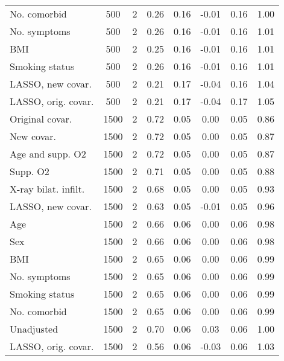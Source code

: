 \documentclass{article}
\begin{document}
\begin{table}[htbp]
{\begin{tabular}{lccccccc}
No. comorbid & 500 & 2 & 0.26 & 0.16 & -0.01 & 0.16 & 1.00\\
No. symptoms & 500 & 2 & 0.26 & 0.16 & -0.01 & 0.16 & 1.01\\
BMI & 500 & 2 & 0.25 & 0.16 & -0.01 & 0.16 & 1.01\\
Smoking status & 500 & 2 & 0.26 & 0.16 & -0.01 & 0.16 & 1.01\\
LASSO, new covar. & 500 & 2 & 0.21 & 0.17 & -0.04 & 0.16 & 1.04\\
LASSO, orig. covar. & 500 & 2 & 0.21 & 0.17 & -0.04 & 0.17 & 1.05\\ \midrule
Original covar. & 1500 & 2 & 0.72 & 0.05 & 0.00 & 0.05 & 0.86\\
New covar. & 1500 & 2 & 0.72 & 0.05 & 0.00 & 0.05 & 0.87\\
Age and supp. O2 & 1500 & 2 & 0.72 & 0.05 & 0.00 & 0.05 & 0.87\\
Supp. O2 & 1500 & 2 & 0.71 & 0.05 & 0.00 & 0.05 & 0.88\\
X-ray bilat. infilt. & 1500 & 2 & 0.68 & 0.05 & 0.00 & 0.05 & 0.93\\
LASSO, new covar. & 1500 & 2 & 0.63 & 0.05 & -0.01 & 0.05 & 0.96\\
Age & 1500 & 2 & 0.66 & 0.06 & 0.00 & 0.06 & 0.98\\
Sex & 1500 & 2 & 0.66 & 0.06 & 0.00 & 0.06 & 0.98\\
BMI & 1500 & 2 & 0.65 & 0.06 & 0.00 & 0.06 & 0.99\\
No. symptoms & 1500 & 2 & 0.65 & 0.06 & 0.00 & 0.06 & 0.99\\
Smoking status & 1500 & 2 & 0.65 & 0.06 & 0.00 & 0.06 & 0.99\\
No. comorbid & 1500 & 2 & 0.65 & 0.06 & 0.00 & 0.06 & 0.99\\
Unadjusted & 1500 & 2 & 0.70 & 0.06 & 0.03 & 0.06 & 1.00\\
LASSO, orig. covar. & 1500 & 2 & 0.56 & 0.06 & -0.03 & 0.06 & 1.03\\ \bottomrule
\hline
\end{tabular}}
\end{table}
\end{document}
